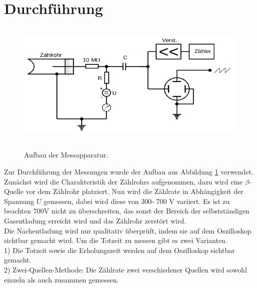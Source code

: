 \section{Durchführung}
\label{sec:Durchführung}

\begin{figure}
  \centering
  \includegraphics[height=6cm]{aufbau.png}
  \caption{Aufbau der Messapparatur.}
  \cite{skript}
  \label{fig:aufbau}
\end{figure}
Zur Durchführung der Messungen wurde der Aufbau aus Abbildung \ref{fig:aufbau}
verwendet. Zunächst wird die Charakteristik der Zählrohrs aufgenommen, dazu
wird eine $\beta$-Quelle vor dem Zählrohr platziert. Nun wird die
Zählrate in Abhängigkeit der Spannung $U$ gemessen, dabei wird diese
von 300- 700 \;V variiert. Es ist zu beachten 700\;V nicht zu überschreiten, das
sonst der Bereich der selbstständigen Gasentladung erreicht wird und das
Zählrohr zerstört wird.\\
Die Nachentladung wird nur qualitativ überprüft, indem sie auf dem
Oszilloskop sichtbar gemacht wird.
Um die Totzeit zu messen gibt es zwei Varianten.\\
1) Die Totzeit sowie die Erholungszeit werden auf dem Oszilloskop sichtbar gemacht.\\
2) Zwei-Quellen-Methode: Die Zählrate zwei verschiedener Quellen wird
 sowohl einzeln als auch zusammen gemessen.
